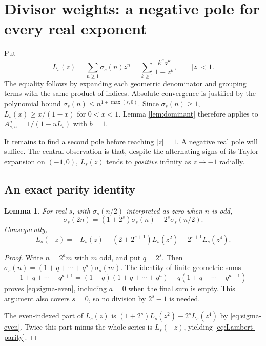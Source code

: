 \documentclass[11pt,letterpaper]{article}
\newtheorem{lemma}[theorem]{Lemma}
\theoremstyle{definition}
\newcommand{\sig}{\sigma}
\numberwithin{equation}{section}
\begin{document}
\section{Divisor weights: a negative pole for every real exponent}
\label{sec:lambert}

Put
\begin{equation}\label{eq:Lambert}
L_s(z)=\sum_{n\ge1}\sig_s(n)z^n
      =\sum_{k\ge1}\frac{k^s z^k}{1-z^k},\qquad |z|<1.
\end{equation}
The equality follows by expanding each geometric denominator and grouping
terms with the same product of indices. Absolute convergence is justified
by the polynomial bound
$\sig_s(n)\le n^{1+\max(s,0)}$.
Since $\sig_s(n)\ge1$, $L_s(x)\ge x/(1-x)$ for $0<x<1$.
Lemma \ref{lem:dominant} therefore applies to
$A^\sig_{s,u}=1/(1-uL_s)$ with $b=1$.

It remains to find a second pole before reaching $|z|=1$.
A negative real pole will suffice. The central observation is that,
despite the alternating signs of its Taylor expansion on $(-1,0)$,
$L_s(z)$ tends to \emph{positive} infinity as $z\to-1$ radially.

\subsection{An exact parity identity}

\begin{lemma}\label{lem:parity}
For real $s$, with $\sig_s(n/2)$ interpreted as zero when $n$ is odd,
\begin{equation}\label{eq:sigma-even}
\sig_s(2n)=(1+2^s)\sig_s(n)-2^s\sig_s(n/2).
\end{equation}
Consequently,
\begin{equation}\label{eq:Lambert-parity}
L_s(-z)=-L_s(z)+(2+2^{s+1})L_s(z^2)-2^{s+1}L_s(z^4).
\end{equation}
\end{lemma}
\begin{proof}
Write $n=2^a m$ with $m$ odd, and put $q=2^s$.
Then $\sig_s(n)=(1+q+\cdots+q^a)\sig_s(m)$.
The identity of finite geometric sums
\[
1+q+\cdots+q^{a+1}
=(1+q)(1+q+\cdots+q^a)-q(1+q+\cdots+q^{a-1})
\]
proves \eqref{eq:sigma-even}, including $a=0$ when the final sum is empty.
This argument also covers $s=0$, so no division by $2^s-1$ is needed.

The even-indexed part of $L_s(z)$ is
$(1+2^s)L_s(z^2)-2^sL_s(z^4)$ by \eqref{eq:sigma-even}.
Twice this part minus the whole series is $L_s(-z)$, yielding
\eqref{eq:Lambert-parity}.
\end{proof}
\end{document}
